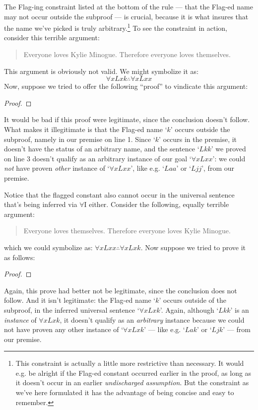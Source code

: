 The Flag-ing constraint listed at the bottom of the rule --- that the Flag-ed name may not occur outside the subproof --- is crucial, because it is what insures that the name we've picked is truly arbitrary.\footnote{This constraint is actually a little more restrictive than necessary.  It would e.g. be alright if the Flag-ed constant occurred earlier in the proof, as long as it doesn't occur in an earlier \emph{undischarged assumption}.  But the constraint as we've here formulated it has the advantage of being concise and easy to remember.}  To see the constraint in action, consider this terrible argument:
	\begin{quote}
		Everyone loves Kylie Minogue.  Therefore everyone loves themselves.
	\end{quote}
This argument is obviously not valid.  We might symbolize it as:
$$\forall x Lxk \therefore \forall x Lxx$$
Now, suppose we tried to offer the following ``proof'' to vindicate this argument:
\begin{proof}
	\open
	 \fl{}
	 
	\close
	 
\end{proof}\noindent
It would be bad if this proof were legitimate, since the conclusion doesn't follow.  What makes it illegitimate is that the Flag-ed name `$k$' occurs outside the subproof, namely in our premise on line 1. Since `$k$' occurs in the premise, it doesn't have the status of an arbitrary name, and the sentence `$Lkk$' we proved on line 3 doesn't qualify as an arbitrary instance of our goal `$\forall xLxx$': we could \emph{not} have proven \emph{other} instance of `$\forall xLxx$', like e.g. `$Laa$' or `$Ljj$', from our premise.

Notice that the flagged constant also cannot occur in the universal sentence that's being inferred via $\forall$I either.  Consider the following, equally terrible argument:

	\begin{quote}
		Everyone loves themselves.  Therefore everyone loves Kylie Minogue.
\end{quote}
which we could symbolize as: $\forall xLxx \therefore \forall xLxk$.  Now suppose we tried to prove it as follows:
\begin{proof}
	\open
	 \fl{}
	 
	\close
	 
\end{proof}\noindent
Again, this prove had better not be legitimate, since the conclusion does not follow.  And it isn't legitimate: the Flag-ed name `$k$' occurs outside of the subproof, in the inferred universal sentence `$\forall x Lxk$'.  Again, although `$Lkk$' is an \emph{instance} of $\forall xLxk$, it doesn't qualify as an \emph{arbitrary} instance because we could not have proven any other instance of `$\forall xLxk$' --- like e.g. `$Lak$' or `$Ljk$' --- from our premise.  

